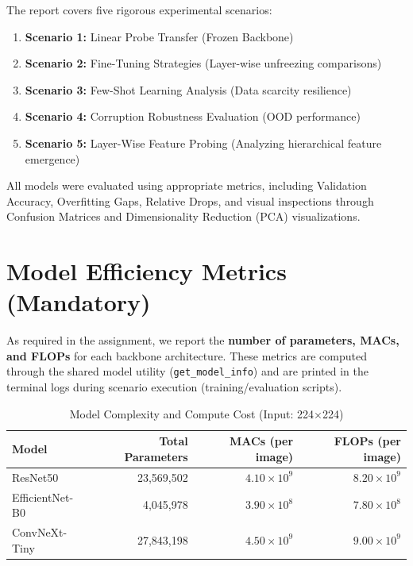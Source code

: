 \documentclass[12pt,a4paper]{article}
\begin{document}
The report covers five rigorous experimental scenarios:
\begin{enumerate}[nosep]
  \item \textbf{Scenario 1:} Linear Probe Transfer (Frozen Backbone)
  \item \textbf{Scenario 2:} Fine-Tuning Strategies (Layer-wise unfreezing comparisons)
  \item \textbf{Scenario 3:} Few-Shot Learning Analysis (Data scarcity resilience)
  \item \textbf{Scenario 4:} Corruption Robustness Evaluation (OOD performance)
  \item \textbf{Scenario 5:} Layer-Wise Feature Probing (Analyzing hierarchical feature emergence)
\end{enumerate}

All models were evaluated using appropriate metrics, including Validation Accuracy, Overfitting Gaps, Relative Drops, and visual inspections through Confusion Matrices and Dimensionality Reduction (PCA) visualizations.


\section{Model Efficiency Metrics (Mandatory)}
\label{sec:efficiency}

As required in the assignment, we report the \textbf{number of parameters, MACs, and FLOPs} for each backbone architecture. These metrics are computed through the shared model utility (\texttt{get\_model\_info}) and are printed in the terminal logs during scenario execution (training/evaluation scripts).

\begin{table}[H]
    \centering
    \caption{Model Complexity and Compute Cost (Input: 224$\times$224)}
    \begin{tabular}{lrrr}
        \toprule
        Model & Total Parameters & MACs (per image) & FLOPs (per image) \\
        \midrule
        ResNet50 & 23,569,502 & $4.10\times10^9$ & $8.20\times10^9$ \\
        EfficientNet-B0 & 4,045,978 & $3.90\times10^8$ & $7.80\times10^8$ \\
        ConvNeXt-Tiny & 27,843,198 & $4.50\times10^9$ & $9.00\times10^9$ \\
        \bottomrule
    \end{tabular}
\end{table}
\end{document}
